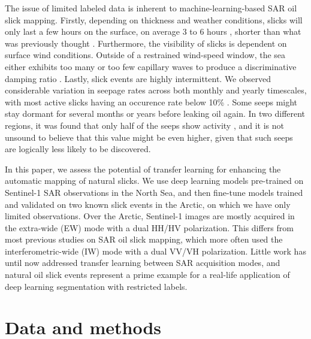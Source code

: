 \documentclass[journal]{IEEEtran}
\begin{document}
The issue of limited labeled data is inherent to machine-learning-based SAR oil slick mapping. 
\IEEEpubidadjcol 
Firstly, depending on thickness and weather conditions, slicks will only last a few hours on the surface, on average 3 
\cite{jatiaultMonitoringNaturalOil2017} to 6 hours \cite{daneshgaraslHindcastModelingOil2017,oreillyDistributionMagnitudeVariability2022}, shorter than what was previously thought 
\cite{macdonaldNaturalOilSpills1998,macdonaldNaturalUnnaturalOil2015}. Furthermore, the visibility of slicks is dependent on surface wind conditions. Outside of a restrained wind-speed window, 
the sea either exhibits too many or too few capillary waves to produce a discriminative damping ratio \cite{quigleyInvestigationDampingRatio2023,sausDetectionDelineationProduced2021,gadeImagingBiogenicAnthropogenic1998}. 
Lastly, slick events are highly intermittent. We observed considerable variation in seepage rates across both monthly and yearly timescales, with most active slicks having an occurence rate below 10\% 
\cite{jatiaultNaturalOilSeep2024,oreillyDistributionMagnitudeVariability2022}. Some seeps might stay dormant for several months or years before leaking oil again. In two different regions, it was found that only
half of the seeps show activity \cite{jatiaultMonitoringNaturalOil2017,garcia-pinedaRemotesensingEvaluationGeophysical2010}, and it is not unsound to believe that this value might be even higher, 
given that such seeps are logically less likely to be discovered.

In this paper, we assess the potential of transfer learning for enhancing the automatic mapping of natural slicks. 
We use deep learning models pre-trained on Sentinel-1 SAR observations in the North Sea, and then fine-tune models trained and validated on two known slick events in the Arctic, on which we have only limited observations.
Over the Arctic, Sentinel-1 images are mostly acquired in the extra-wide (EW) mode with a dual HH/HV polarization. This differs from most previous studies on SAR oil slick mapping, which more often used the 
interferometric-wide (IW) mode with a dual VV/VH polarization. Little work has until now addressed transfer learning between SAR acquisition modes, and natural oil slick events represent 
a prime example for a real-life application of deep learning segmentation with restricted labels. 

\section{Data and methods}
\end{document}
